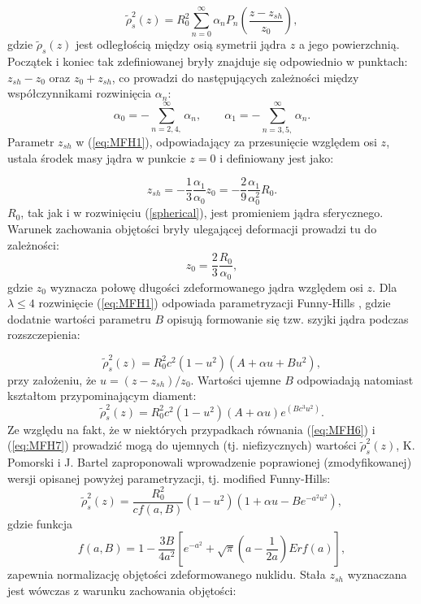 \documentclass[a4paper,polish,twoside]{article}
\numberwithin{equation}{section}
\begin{document}
\begin{equation} \label{eq:MFH1}
\tilde{\rho}^{2}_{s}(z)=R_{0}^{2}\sum_{n=0}^{\infty}\alpha_{n}P_{n}\left(\frac{z-z_{sh}}{z_{0}}\right),
\end{equation}
gdzie $\tilde{\rho}_{s}(z)$ jest odległością między osią symetrii jądra $z$ a jego powierzchnią. Początek i koniec tak zdefiniowanej bryły znajduje się odpowiednio w punktach: $z_{sh}-z_{0}$ oraz $z_{0}+z_{sh}$, co prowadzi do następujących zależności między współczynnikami rozwinięcia $\alpha_{n}$:
\begin{equation} \label{eq:MFH2}
\alpha_{0}=-\sum_{n=2,4,}^{\infty}\alpha_{n}, \qquad \alpha_{1}=-\sum_{n=3,5,}^{\infty}\alpha_{n}.
\end{equation}
Parametr $z_{sh}$ w (\ref{eq:MFH1}), odpowiadający za przesunięcie względem osi $z$, ustala środek masy jądra w punkcie $z=0$ i definiowany jest jako:

\begin{equation} \label{eq:MFH3}
z_{sh}=-\frac{1}{3}\frac{\alpha_{1}}{\alpha_{0}}z_{0}=-\frac{2}{9}\frac{\alpha_{1}}{\alpha_{0}^{2}}R_{0}.
\end{equation}
$R_{0}$, tak jak i w rozwinięciu (\ref{spherical}), jest promieniem jądra sferycznego. Warunek zachowania objętości bryły ulegającej deformacji prowadzi tu do zależności:
\begin{equation} \label{eq:MFH4}
z_{0}=\frac{2}{3}\frac{R_{0}}{\alpha_{0}},
\end{equation}
gdzie $z_{0}$ wyznacza połowę długości zdeformowanego jądra względem osi $z$. Dla $\lambda\leq4$ rozwinięcie (\ref{eq:MFH1}) odpowiada parametryzacji Funny-Hills \cite{OLDMFH}, gdzie dodatnie wartości parametru $B$ opisują formowanie się tzw. szyjki jądra podczas rozszczepienia: 

\begin{equation} \label{eq:MFH6}
\tilde{\rho}^{2}_{s}(z)=R_{0}^{2}c^{2}(1-u^{2})(A+\alpha u+Bu^{2}),
\end{equation}
przy założeniu, że $u=(z-z_{sh}) /z_{0}$.
Wartości ujemne $B$ odpowiadają natomiast kształtom przypominającym diament:
\begin{equation} \label{eq:MFH7}
\tilde{\rho}^{2}_{s}(z)=R_{0}^{2}c^{2}(1-u^{2})(A+\alpha u)e^{(Bc^{3}u^{2})}.
\end{equation}
Ze względu na fakt, że w niektórych przypadkach równania (\ref{eq:MFH6}) i (\ref{eq:MFH7}) prowadzić mogą do ujemnych (tj. niefizycznych) wartości $\tilde{\rho}^{2}_{s}(z)$, K. Pomorski i J. Bartel zaproponowali wprowadzenie poprawionej (zmodyfikowanej) wersji opisanej powyżej parametryzacji, tj. modified Funny-Hills:
\begin{equation} \label{eq:MFH8}
\tilde{\rho}^{2}_{s}(z)=\frac{R_{0}^{2}}{c f(a,B)}(1-u^{2})(1+\alpha u-Be^{-a^{2}u^{2}}),
\end{equation}
gdzie funkcja
\begin{equation} \label{eq:MFH9}
f(a,B)=1-\frac{3B}{4a^{2}}\left[e^{-a^{2}}+\sqrt{\pi}(a-\frac{1}{2a})Erf(a)\right],
\end{equation}
zapewnia normalizację objętości zdeformowanego nuklidu. Stała $z_{sh}$ wyznaczana jest wówczas z warunku zachowania objętości:
\end{document}
